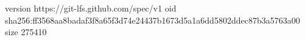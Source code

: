 version https://git-lfs.github.com/spec/v1
oid sha256:ff3568aa8badaf3f8a65f3d74e24437b1673d5a1a6dd5802ddec87b3a5763a00
size 275410
